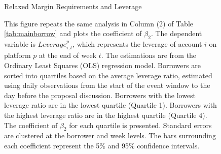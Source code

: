 \begin{figure}[ht!]
\centering
\caption{Relaxed Margin Requirements and Leverage }\label{fig:post_lev}
\caption*{This figure repeats the same analysis in Column (2) of Table \ref{tab:mainborrow} and plots the coefficient of $\beta_2$. The dependent variable is $Leverage_{i,t}^p$, which represents the leverage of account $i$ on platform $p$ at the end of week $t$. The estimations are from the Ordinary Least Squares (OLS) regression model. Borrowers are sorted into quartiles based on the average leverage ratio, estimated using daily observations from the start of the event window to the day before the proposal discussion. Borrowers with the lowest leverage ratio are in the lowest quartile (Quartile 1). Borrowers with the highest leverage ratio are in the highest quartile (Quartile 4). The coefficient of $\beta_2$ for each quartile is presented. Standard errors are clustered at the borrower and week levels. The bars surrounding each coefficient represent the 5\% and 95\% confidence intervals. }

\end{figure}


\clearpage
\newpage


